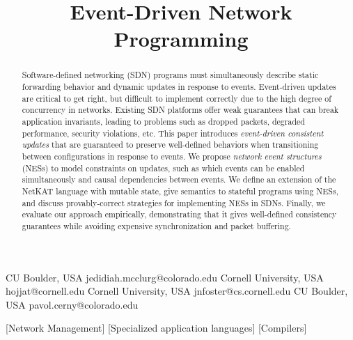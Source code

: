 \documentclass[pldi-cameraready]{sigplanconf}
\begin{document}
\def\titletext{Event-Driven Network Programming}
\title{\titletext}
\preprintfooter{\titletext}



           {CU Boulder, USA}
           {\small jedidiah.mcclurg@colorado.edu}
           {Cornell University, USA}
           {\small hojjat@cornell.edu}
           {Cornell University, USA}
           {\small jnfoster@cs.cornell.edu}
           {CU Boulder, USA}
           {\small pavol.cerny@colorado.edu}



\maketitle

\def\naive/{na\"{\i}ve}

\begin{abstract}
Software-defined networking (SDN) programs must simultaneously
describe static forwarding behavior and dynamic updates in response to
events. Event-driven updates are critical to get right, but
difficult to implement correctly due to the high degree of concurrency
in networks. Existing SDN platforms offer weak guarantees that can 
break application invariants, leading to problems such as dropped
packets, degraded performance, security violations, etc. This paper
introduces {\em event-driven consistent updates} that are
guaranteed to preserve well-defined behaviors when transitioning
between configurations in response to events. We propose {\em network
  event structures} (NESs) to model constraints on updates, such as
which events can be enabled simultaneously and causal dependencies
between events. We define an extension of the NetKAT language with
mutable state, give semantics to stateful programs using NESs, and
discuss provably-correct strategies for implementing NESs in SDNs.
Finally, we evaluate our approach empirically,
demonstrating that it gives well-defined consistency guarantees while
avoiding expensive synchronization and packet buffering.
\end{abstract}

[Network Management]
[Specialized application languages]
[Compilers]
\end{document}
